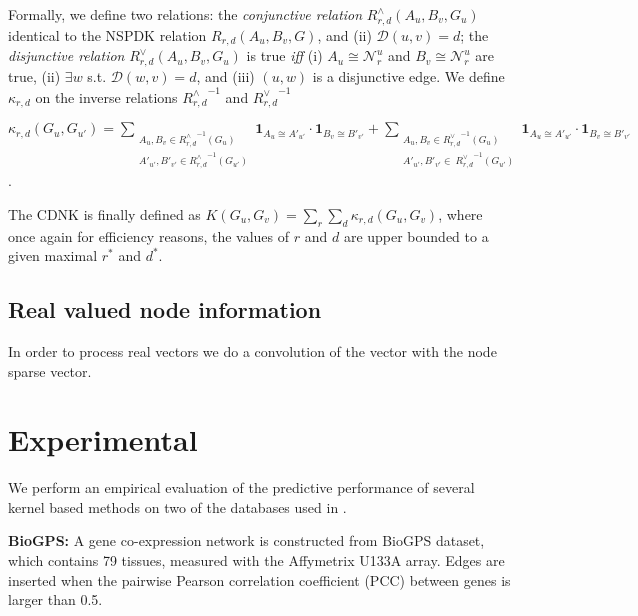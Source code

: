 \documentclass[review]{elsarticle}
\begin{document}
Formally, we define two relations: the \textit{conjunctive relation} $R^{\wedge}_{r,d}(A_u, B_v, G_u)$ identical to the NSPDK relation $R_{r,d}(A_u, B_v, G)$,  and (ii) $\mathcal{D}(u,v)= d$; the \textit{disjunctive relation} $R_{r,d}^{\vee}(A_u, B_v, G_u)$ is true {\em iff} (i)  $A_u \cong \mathcal{N}_r^u$ and $B_v \cong \mathcal{N}_r^u$ are true, (ii) $\exists w$ s.t. $\mathcal{D}(w,v)= d$, and (iii) $(u,w)$ is a disjunctive edge. We define $\kappa_{r,d}$ on the  inverse relations ${R^{\wedge}_{r,d}}^{ -1}$ and ${R^{\vee}_{r,d}}^{ -1}$
\begin{center}
 $\kappa_{r,d}(G_u,G_{u'}) = \!\!\!\!\!\!\!\!\!\!\!\!
 \sum\limits_{\substack {A_u,{B}_{v} \in {R_{r,d}^{\wedge}}^{ -1}(G_u) \\ A'_{u'},{B'}_{v'} \in {R_{r,d}^{\wedge}}^{ -1}(G_{u'}) }} \!\!\!\!\!\!\!\!\!\!\!\!
  { \textbf{1}_{A_u \cong A'_{u'}} \cdot { \textbf{1}_{B_{v} \cong B'_{v'}}}}
+ \!\!\!\!\!\!\!\!\!\!\!\!
 \sum\limits_{\substack {A_u,{B}_{v} \in {R_{r,d}^{\vee}}^{ -1}(G_u) \\
  A'_{u'},{B'}_{v'} \in \ {R_{r,d}^{\vee}}^{ -1}(G_{u'}) }} \!\!\!\!\!\!\!\!\!\!\!\!
  { \textbf{1}_{A_u \cong A'_{u'}} \cdot { \textbf{1}_{B_{v} \cong B'_{v'}}}}
  $.
\end{center}
The CDNK is finally defined as $K(G_u,G_v) = \sum\limits_{r}{\sum\limits_{d}{\kappa_{r,d}(G_u,G_v)}}$, where once again for efficiency reasons, the values of $r$ and $d$ are upper bounded to a given maximal $r^*$ and $d^*$.


\subsection{Real valued node information}
In order to process real vectors we do a convolution of the vector with the node sparse vector.




\section{Experimental}
We perform an empirical evaluation of the predictive performance of several kernel based methods on two of the databases used in \cite{chen2014disease}.

\textbf{BioGPS:} A gene co-expression network is constructed from BioGPS dataset, which contains 79 tissues, measured with the Affymetrix U133A array. Edges are inserted when the pairwise Pearson correlation coefficient (PCC) between genes is larger than 0.5.
\end{document}
